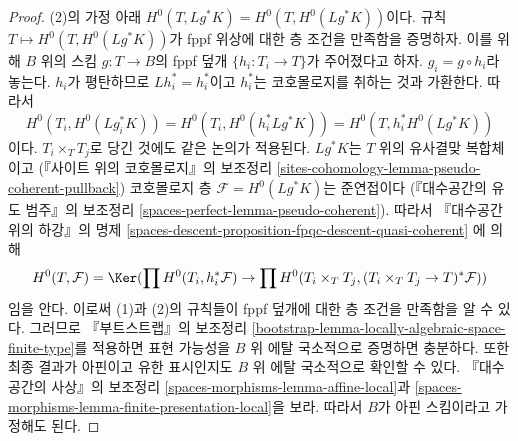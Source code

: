 \begin{proof}
(2)의 가정 아래
$H^0(T, Lg^*K) = H^0(T, H^0(Lg^*K))$이다.
규칙 $T \mapsto H^0(T, H^0(Lg^*K))$가 fppf 위상에 대한 층 조건을
만족함을 증명하자. 이를 위해 $B$ 위의 스킴 $g : T \to B$의
fppf 덮개 $\{h_i : T_i \to T\}$가 주어졌다고 하자.
$g_i = g \circ h_i$라 놓는다. $h_i$가 평탄하므로
$Lh_i^* = h_i^*$이고 $h_i^*$는 코호몰로지를 취하는 것과 가환한다.
따라서
$$
H^0(T_i, H^0(Lg_i^*K)) =
H^0(T_i, H^0(h_i^*Lg^*K)) =
H^0(T, h_i^*H^0(Lg^*K))
$$
이다.
$T_i \times_T T_j$로 당긴 것에도 같은 논의가 적용된다.
$Lg^*K$는 $T$ 위의 유사결맞 복합체이고
(『사이트 위의 코호몰로지』의 보조정리
\ref{sites-cohomology-lemma-pseudo-coherent-pullback})
코호몰로지 층 $\mathcal{F} = H^0(Lg^*K)$는 준연접이다
(『대수공간의 유도 범주』의 보조정리
\ref{spaces-perfect-lemma-pseudo-coherent}).
따라서 『대수공간 위의 하강』의 명제
\ref{spaces-descent-proposition-fpqc-descent-quasi-coherent}
에 의해
$$
H^0(T, \mathcal{F}) = \Ker(
\prod H^0(T_i, h_i^*\mathcal{F}) \to
\prod H^0(T_i \times_T T_j, (T_i \times_T T_j \to T)^*\mathcal{F}))
$$
임을 안다. 이로써 (1)과 (2)의 규칙들이 fppf 덮개에 대한
층 조건을 만족함을 알 수 있다. 그러므로 『부트스트랩』의 보조정리
\ref{bootstrap-lemma-locally-algebraic-space-finite-type}를 적용하면
표현 가능성을 $B$ 위 에탈 국소적으로 증명하면 충분하다.
또한 최종 결과가 아핀이고 유한 표시인지도 $B$ 위 에탈 국소적으로
확인할 수 있다. 『대수공간의 사상』의 보조정리
\ref{spaces-morphisms-lemma-affine-local}과
\ref{spaces-morphisms-lemma-finite-presentation-local}을 보라.
따라서 $B$가 아핀 스킴이라고 가정해도 된다.


\end{proof}
